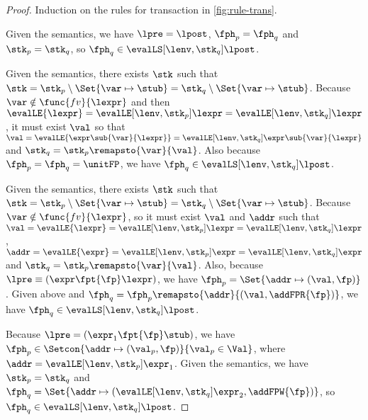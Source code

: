 \begin{proof}
Induction on the rules for transaction in \fig \ref{fig:rule-trans}.

\caseB{\(\trans \equiv \pskip\)}

Given the semantics, we have \( \lpre = \lpost \), \( \fph_{p} = \fph_{q} \) and \( \stk_{p} = \stk_{q} \), so \( \fph_{q} \in \evalLS[\lenv, \stk_{q}]{\lpost} \).

\caseB{\(\trans \equiv ( \pass{\var}{\expr} ) \)}

Given the semantics, there exists \( \stk \) such that \( \stk = \stk_{p} \setminus \Set{\var \mapsto \stub} = \stk_{q} \setminus \Set{\var \mapsto \stub} \).
Because \( \var \notin \func{fv}{\lexpr} \) and then \( \evalLE{\lexpr} = \evalLE[\lenv, \stk_{p}]{\lexpr} = \evalLE[\lenv, \stk_{q}]{\lexpr} \), it must exist \( \val \) so that \( \val = \evalLE{\expr\sub{\var}{\lexpr}} = \evalLE[\lenv, \stk_{q}]{\expr\sub{\var}{\lexpr}} \) and \( \stk_{q} = \stk_{p}\remapsto{\var}{\val} \).
Also because \( \fph_{p} = \fph_{q} = \unitFP \), we have \( \fph_{q} \in \evalLS[\lenv, \stk_{q}]{\lpost} \).

\caseB{\(\trans \equiv ( \pderef{\var}{\expr} ) \)}

Given the semantics, there exists \( \stk \) such that \( \stk = \stk_{p} \setminus \Set{\var \mapsto \stub} = \stk_{q} \setminus \Set{\var \mapsto \stub} \).
Because \( \var \notin \func{fv}{\lexpr} \), so it must exist \( \val \) and \( \addr \) such that \( \val = \evalLE{\lexpr} = \evalLE[\lenv, \stk_{p}]{\lexpr} = \evalLE[\lenv, \stk_{q}]{\lexpr} \), \( \addr = \evalLE{\expr} = \evalLE[\lenv, \stk_{p}]{\expr} = \evalLE[\lenv, \stk_{q}]{\expr} \) and \(  \stk_{q} = \stk_{p}\remapsto{\var}{\val} \).
Also, because \( \lpre \equiv ( \expr \fpt{\fp} \lexpr ) \), we have \( \fph_{p} = \Set{\addr \mapsto (\val, \fp) }\).
Given above and \( \fph_{q} = \fph_{p}\remapsto{\addr}{ ( \val, \addFPR{\fp} ) } \), we have \( \fph_{q} \in \evalLS[\lenv, \stk_{q}]{\lpost} \).


Because \( \lpre = (\expr_{1} \fpt{\fp} \stub ) \), we have \( \fph_{p} \in \Setcon{ \addr \mapsto (\val_{p} , \fp) }{ \val_{p} \in \Val } \), where \( \addr = \evalLE[\lenv, \stk_{p}]{\expr_{1}} \).
Given the semantics, we have \( \stk_{p} = \stk_{q} \) and \( \fph_{q} = \Set{\addr \mapsto ( \evalLE[\lenv, \stk_{q}]{\expr_{2}},  \addFPW{\fp} ) } \), so \( \fph_{q} \in \evalLS[\lenv, \stk_{q}]{\lpost} \).

\end{proof}


